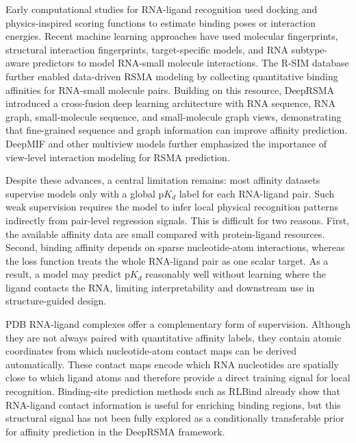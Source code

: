 ﻿\documentclass[journal=jcisd8,manuscript=article]{achemso}
\begin{document}
Early computational studies for RNA-ligand recognition used docking and physics-inspired scoring functions to estimate binding poses or interaction energies.\cite{Guilbert2008DockingRNA,Feng2020ITScoreNL} Recent machine learning approaches have used molecular fingerprints, structural interaction fingerprints, target-specific models, and RNA subtype-aware predictors to model RNA-small molecule interactions.\cite{Grimberg2022MLRNA,Szulc2023FingeRNAt,Krishnan2024RSAPred} The R-SIM database further enabled data-driven RSMA modeling by collecting quantitative binding affinities for RNA-small molecule pairs.\cite{Krishnan2023RSIM} Building on this resource, DeepRSMA introduced a cross-fusion deep learning architecture with RNA sequence, RNA graph, small-molecule sequence, and small-molecule graph views, demonstrating that fine-grained sequence and graph information can improve affinity prediction.\cite{Huang2024DeepRSMA} DeepMIF and other multiview models further emphasized the importance of view-level interaction modeling for RSMA prediction.\cite{Song2026DeepMIF,Wu2025MultiviewRNA}

Despite these advances, a central limitation remains: most affinity datasets supervise models only with a global p$K_d$ label for each RNA-ligand pair. Such weak supervision requires the model to infer local physical recognition patterns indirectly from pair-level regression signals. This is difficult for two reasons. First, the available affinity data are small compared with protein-ligand resources. Second, binding affinity depends on sparse nucleotide-atom interactions, whereas the loss function treats the whole RNA-ligand pair as one scalar target. As a result, a model may predict p$K_d$ reasonably well without learning where the ligand contacts the RNA, limiting interpretability and downstream use in structure-guided design.

PDB RNA-ligand complexes offer a complementary form of supervision. Although they are not always paired with quantitative affinity labels, they contain atomic coordinates from which nucleotide-atom contact maps can be derived automatically. These contact maps encode which RNA nucleotides are spatially close to which ligand atoms and therefore provide a direct training signal for local recognition. Binding-site prediction methods such as RLBind already show that RNA-ligand contact information is useful for enriching binding regions,\cite{Wang2023RLBind} but this structural signal has not been fully explored as a conditionally transferable prior for affinity prediction in the DeepRSMA framework.
\end{document}

